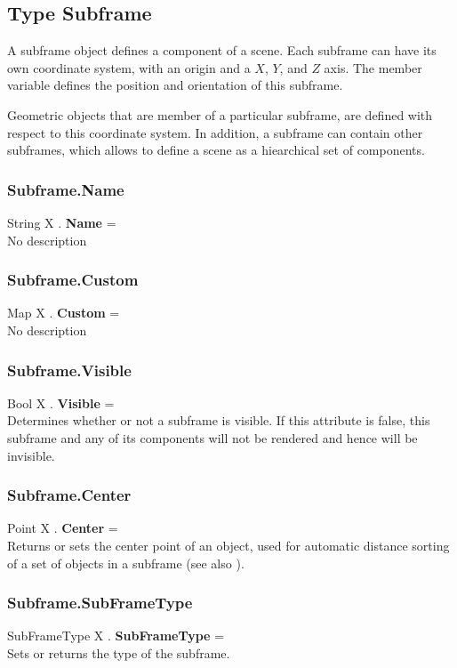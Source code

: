 \subsection{Type Subframe \label{T:Subframe}}
A subframe object defines a component of a scene. Each subframe can have its own coordinate system, with an origin and a $X$, $Y$, and $Z$ axis. The member variable  defines the position and orientation of this subframe.

Geometric objects that are member of a particular subframe, are defined with respect to this coordinate system. In addition, a subframe can contain other subframes, which allows to define a scene as a hiearchical set of components.

\subsubsection{Subframe.Name \label{F:Subframe:Name}}
String X . \textbf{Name} = \\
No description

\subsubsection{Subframe.Custom \label{F:Subframe:Custom}}
Map X . \textbf{Custom} = \\
No description

\subsubsection{Subframe.Visible \label{F:Subframe:Visible}}
Bool X . \textbf{Visible} = \\
Determines whether or not a subframe is visible. If this attribute is false, this subframe and any of its components will not be rendered and hence will be invisible.

\subsubsection{Subframe.Center \label{F:Subframe:Center}}
Point X . \textbf{Center} = \\
Returns or sets the center point of an object, used for automatic distance sorting of a set of objects in a subframe (see also ).

\subsubsection{Subframe.SubFrameType \label{F:Subframe:SubFrameType}}
SubFrameType X . \textbf{SubFrameType} = \\
Sets or returns the type of the subframe.

